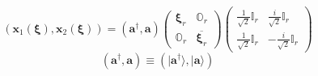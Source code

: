 \documentclass[aps, preprint]{revtex4}
\begin{document}
\begin{equation}\left (\mathbf{x}_{1} \left (\mathbf{\xi }\right ) ,\mathbf{x}_{2} \left (\mathbf{\xi }\right )\right ) =\left (\mathbf{a}^{ \dag } ,\mathbf{a}\right )\left (\begin{array}{cc}\mathbf{\xi }_{r} & \mathbb{O}_{r} \\
\mathbb{O}_{r} & \overline{\mathbf{\xi }_{r}}\end{array}\right ) \left (\begin{array}{cc}\frac{1}{\sqrt{2}} \mathbb{I}_{r} & \frac{i}{\sqrt{2}} \mathbb{I}_{r} \\
\frac{1}{\sqrt{2}} \mathbb{I}_{r} &  -\frac{i}{\sqrt{2}} \mathbb{I}_{r}\end{array}\right )
\end{equation}
\begin{equation}\left (\mathbf{a}^{ \dag } ,\mathbf{a}\right ) \equiv \left (\vert \mathbf{a}^{ \dag } \rangle  ,\vert \mathbf{a} \rangle \right )
\end{equation}
\end{document}
